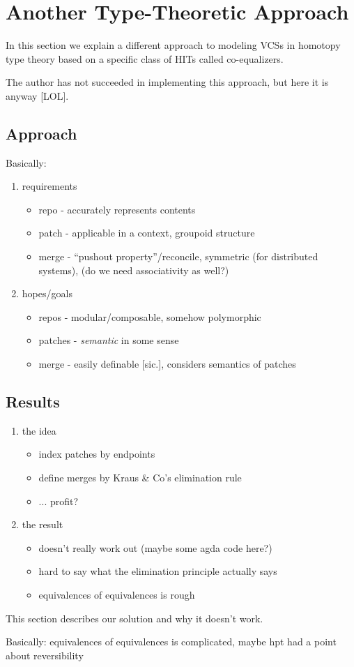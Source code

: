 \section{Another Type-Theoretic Approach}

In this section we explain a different approach to modeling VCSs in homotopy
type theory based on a specific class of HITs called co-equalizers.

The author has not succeeded in implementing this approach, but here it is
anyway [LOL].

\subsection{Approach}
Basically:
\begin{enumerate}
\item requirements
  \begin{itemize}
  \item repo - accurately represents contents
  \item patch - applicable in a context, groupoid structure
  \item merge - ``pushout property''/reconcile, symmetric (for distributed
    systems), (do we need associativity as well?)
  \end{itemize}
\item hopes/goals
  \begin{itemize}
  \item repos - modular/composable, somehow polymorphic
  \item patches - \emph{semantic} in some sense
  \item merge - easily definable [sic.], considers semantics of patches
  \end{itemize}
\end{enumerate}

\subsection{Results}
\begin{enumerate}
\item the idea
  \begin{itemize}
  \item index patches by endpoints
  \item define merges by Kraus \& Co's elimination rule
  \item ... profit?
  \end{itemize}
\item the result
  \begin{itemize}
  \item doesn't really work out (maybe some agda code here?)
  \item hard to say what the elimination principle actually says
  \item equivalences of equivalences is rough
  \end{itemize}
\end{enumerate}
This section describes our solution and why it doesn't work.

Basically: equivalences of equivalences is complicated, maybe hpt had a point
about reversibility